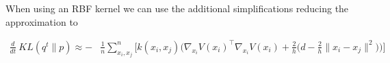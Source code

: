 \documentclass{article}
\begin{document}
    When using an RBF kernel we can use the additional simplifications reducing the approximation to

    \begin{align}
        \frac{d}{dt}\ KL( q^t \| p ) \approx -& \frac{1}{n}\sum_{x_i,x_j}^n  \Bigg[
            k(x_i,x_j) \Bigg( \nabla_{x_i} V(x_i)^\top \nabla_{x_i} V(x_i)  
            + \frac{2}{h}\Big( d - \frac{2}{h} \|x_i - x_j\|^2 \Big) \Bigg)
        \Bigg]
    \end{align} 


\end{document}
